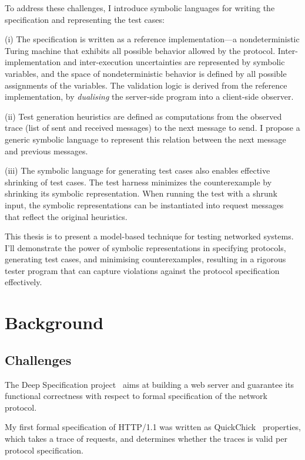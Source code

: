 \documentclass{article}
\newcommand{\http}{HTTP/1.1\xspace}
\theoremstyle{definition}
\begin{document}
To address these challenges, I introduce symbolic languages for writing the
specification and representing the test cases:

(i) The specification is written as a reference implementation---a
nondeterministic Turing machine that exhibits all possible behavior allowed by
the protocol.  Inter-implementation and inter-execution uncertainties are
represented by symbolic variables, and the space of nondeterministic behavior is
defined by all possible assignments of the variables.  The validation logic is
derived from the reference implementation, by {\em dualising} the server-side
program into a client-side observer.

(ii) Test generation heuristics are defined as computations from the observed
trace (list of sent and received messages) to the next message to send.  I
propose a generic symbolic language to represent this relation between the next
message and previous messages.

(iii) The symbolic language for generating test cases also enables effective
shrinking of test cases.  The test harness minimizes the counterexample by
shrinking its symbolic representation.  When running the test with a shrunk
input, the symbolic representations can be instantiated into request messages
that reflect the original heuristics.

This thesis is to present a model-based technique for testing networked systems.
I'll demonstrate the power of symbolic representations in specifying protocols,
generating test cases, and minimising counterexamples, resulting in a rigorous
tester program that can capture violations against the protocol specification
effectively.

\section{Background}

\subsection{Challenges}
The Deep Specification project~\cite{deepspec} aims at building a web server and
guarantee its functional correctness with respect to formal specification of the
network protocol.

My first formal specification of \http was written as
QuickChick~\cite{quickchick} properties, which takes a trace of requests, and
determines whether the traces is valid per protocol specification.
\end{document}
